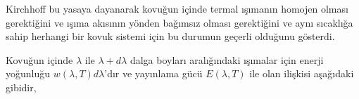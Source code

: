 \documentclass[a4paper,12pt, twoside]{article}
\begin{document}
Kirchhoff bu yasaya dayanarak kovuğun içinde termal ışımanın homojen olması gerektiğini ve ışıma akısının yönden bağımsız olması gerektiğini ve aynı sıcaklığa sahip herhangi bir kovuk sistemi için bu durumun geçerli olduğunu gösterdi.





Kovuğun içinde $\lambda$ ile $\lambda+d\lambda$ dalga boyları aralığındaki ışımalar için enerji yoğunluğu $w(\lambda,T) d\lambda$'dır ve yayınlama gücü $E(\lambda,T)$ ile olan ilişkisi aşağıdaki gibidir,
 
\end{document}
